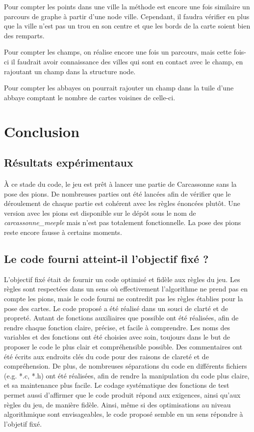 \documentclass[12pt]{article}
\begin{document}
Pour compter les points dans une ville la méthode est encore une fois similaire un parcours de graphe à partir d'une node ville. Cependant, il faudra vérifier en plus que la ville n'est pas un trou en son centre et que les bords de la carte soient bien des remparts.

Pour compter les champs, on réalise encore une fois un parcours, mais cette fois-ci il faudrait avoir connaissance des villes qui sont en contact avec le champ, en rajoutant un champ dans la structure node.

Pour compter les abbayes on pourrait rajouter un champ dans la tuile d'une abbaye comptant le nombre de cartes voisines de celle-ci.

\section{Conclusion}

\subsection{Résultats expérimentaux}

\paragraph{} À ce stade du code, le jeu est prêt à lancer une partie de Carcassonne sans la pose des pions. De nombreuses parties ont été lancées afin de vérifier que le déroulement de chaque partie est cohérent avec les règles énoncées plutôt. Une version avec les pions est disponible sur le dépôt sous le nom de \textit{carcassonne\_meeple} mais n'est pas totalement fonctionnelle. La pose des pions reste encore fausse à certains moments.

\subsection{Le code fourni atteint-il l'objectif fixé ?}

L'objectif fixé était de fournir un code optimisé et fidèle aux règles du jeu. Les règles sont respectées dans un sens où effectivement l'algorithme ne prend pas en compte les pions, mais le code fourni ne contredit pas les règles établies pour la pose des cartes. Le code proposé a été réalisé dans un souci de clarté et de propreté. Autant de fonctions auxiliaires que possible ont été réalisées, afin de rendre chaque fonction claire, précise, et facile à comprendre. Les noms des variables et des fonctions ont été choisies avec soin, toujours dans le but de proposer le code le plus clair et compréhensible possible. Des commentaires ont été écrits aux endroits clés du code pour des raisons de clareté et de compréhension. De plus, de nombreuses séparations du code en différents fichiers (e.g. *.c, *.h) ont été réalisées, afin de rendre la manipulation du code plus claire, et sa maintenance plus facile.
  Le codage systématique des fonctions de test permet aussi d'affirmer que le code produit répond aux exigences, ainsi qu'aux règles du jeu, de manière fidèle. Ainsi, même si des optimisations au niveau algorithmique sont envisageables, le code proposé semble en un sens répondre à l'objetif fixé. 
\end{document}
